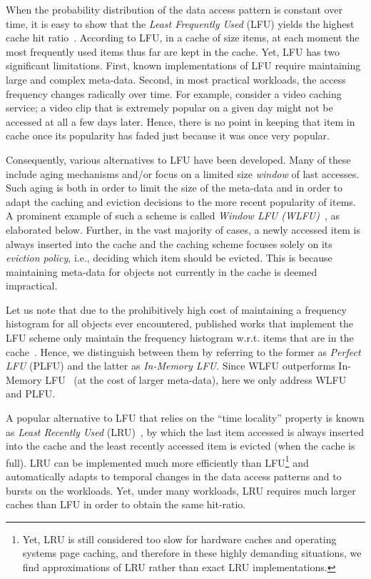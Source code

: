 \documentclass[10pt,a4paper]{article}
\begin{document}
When the probability distribution of the data access pattern is constant over time, it is easy to show that the \emph{Least Frequently Used} (LFU)
yields the highest cache hit ratio~\cite{BCFPS99,ZipfCaching}.
According to LFU, in a cache of size  items, at each moment the  most frequently used items thus far are kept in the cache.
Yet, LFU has two significant limitations.
First, known implementations of LFU require maintaining large and complex meta-data.
Second, in most practical workloads, the access frequency changes radically over time.
For example, consider a video caching service; a video clip that is extremely popular on a given day might not be accessed at all a few days later.
Hence, there is no point in keeping that item in cache once its popularity has faded just because it was once very popular.

Consequently, various alternatives to LFU have been developed.
Many of these include aging mechanisms and/or focus on a limited size \emph{window} of last  accesses.
Such aging is both in order to limit the size of the meta-data and in order to adapt the caching and eviction decisions to the more recent popularity of items.
A prominent example of such a scheme is called \emph{Window LFU (WLFU)}~\cite{WLFU}, as elaborated below.
Further, in the vast majority of cases, a newly accessed item is always inserted into the cache and the caching scheme focuses solely on its \emph{eviction policy}, i.e.,
deciding which item should be evicted.
This is because maintaining meta-data for objects not currently in the cache is deemed impractical.

Let us note that due to the prohibitively high cost of maintaining a frequency histogram for all objects ever encountered, published works that implement
the LFU scheme only maintain the frequency histogram w.r.t. items that are in the cache~\cite{SurveyOfCacheReplecmentStrategies}.
Hence, we distinguish between them by referring to the former as \emph{Perfect LFU} (PLFU) and the latter as \emph{In-Memory LFU}.
Since WLFU outperforms In-Memory LFU~\cite{BCFPS99} (at the cost of larger meta-data), here we only address WLFU and PLFU.

A popular alternative to LFU that relies on the ``time locality'' property is known as \emph{Least Recently Used} (LRU)~\cite{LRU}, by which the last item
accessed is always inserted into the cache and the least recently accessed item is evicted (when the cache is full).
LRU can be implemented much more efficiently than LFU\footnote{Yet, LRU is still considered too slow for hardware caches and operating systems page caching, and therefore in these highly demanding situations, we find approximations of LRU rather than exact LRU implementations.} and automatically
adapts to temporal changes in the data access patterns and to bursts on the workloads.
Yet, under many workloads, LRU requires much larger caches than LFU in order to obtain the same hit-ratio.
\end{document}
